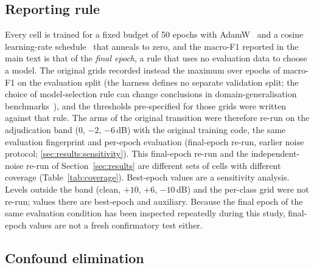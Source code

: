 \subsection{Reporting rule}
\label{sec:protocol:report}

Every cell is trained for a fixed budget of 50 epochs with AdamW~\cite{loshchilov2019adamw} and a cosine learning-rate schedule~\cite{loshchilov2017sgdr} that anneals to zero, and the macro-F1 reported in the main text is that of the \emph{final epoch}, a rule that uses no evaluation data to choose a model. The original grids recorded instead the maximum over epochs of macro-F1 on the evaluation split (the harness defines no separate validation split; the choice of model-selection rule can change conclusions in domain-generalisation benchmarks~\cite{gulrajani2021domainbed}), and the thresholds pre-specified for those grids were written against that rule. The arms of the original transition were therefore re-run on the adjudication band ($0$, $-2$, $-6$\,dB) with the original training code, the same evaluation fingerprint and per-epoch evaluation (final-epoch re-run, earlier noise protocol; \ref{sec:results:sensitivity}). This final-epoch re-run and the independent-noise re-run of Section~\ref{sec:results} are different sets of cells with different coverage (Table~\ref{tab:coverage}). Best-epoch values are a sensitivity analysis. Levels outside the band (clean, $+10$, $+6$, $-10$\,dB) and the per-class grid were not re-run; values there are best-epoch and auxiliary. Because the final epoch of the same evaluation condition has been inspected repeatedly during this study, final-epoch values are not a fresh confirmatory test either.

\subsection{Confound elimination}
\label{sec:protocol:confounds}

